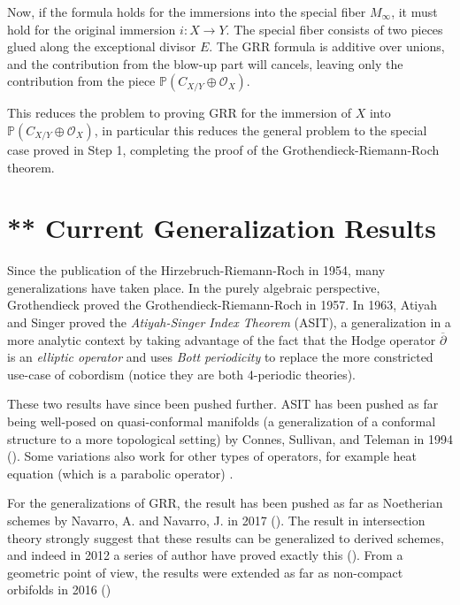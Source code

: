 \documentclass{ut-thesis}
\newenvironment{Proof}[1][]
  {\begin{ProofTcb}[#1]}
  {\end{ProofTcb}}
\renewcommand{\P}{{\mathbb{P}}}
\newcommand{\CO}{{\mathcal{O}}}
\begin{document}
\begin{Proof}
  Now, if the formula holds for the immersions into the special fiber $M_\infty$, it must hold for the original
  immersion $i: X \to Y$. The special fiber consists of two pieces glued along the exceptional divisor $E$. The
  GRR formula is additive over unions, and the contribution from the blow-up part will cancels, leaving only the
  contribution from the piece $\P(C_{X/Y} \oplus \CO_X)$.

  This reduces the problem to proving GRR for the immersion of $X$ into $\P(C_{X/Y} \oplus \CO_X)$, in
  particular this reduces the general problem to the special case proved in Step 1, completing the
  proof of the Grothendieck-Riemann-Roch theorem.
\end{Proof}


\section{** Current Generalization Results}\label{sec:DRR}

Since the publication of the Hirzebruch-Riemann-Roch in 1954, many generalizations have taken place. In the
purely algebraic perspective, Grothendieck proved the Grothendieck-Riemann-Roch in 1957. In 1963, Atiyah and
Singer proved the \emph{Atiyah-Singer Index Theorem} (ASIT), a generalization in a more analytic context by taking
advantage of the fact that the Hodge operator $\overline{\partial}$ is an \emph{elliptic operator} and uses
\emph{Bott periodicity} to replace the more constricted use-case of cobordism (notice they are both
4-periodic theories).

These two results have since been pushed further. ASIT has been pushed as far being well-posed on
quasi-conformal manifolds (a generalization of a conformal structure to a more topological setting) by
Connes, Sullivan, and Teleman in 1994 (\cite{connesQuasiconformalMappingsOperators1994}). Some variations
also work for other types of operators, for example heat equation (which is a parabolic operator)
\cite{gilkeyInvarianceTheoryHeat2018}.

For the generalizations of GRR, the result has been pushed as far as Noetherian schemes by Navarro, A. and
Navarro, J. in 2017 (\cite{navarroRiemannRochFormulaProjective2017}). The result in intersection theory
strongly suggest that these results can be generalized to derived schemes, and indeed in 2012 a series of
author have proved exactly this (\cite{lowreyGrothendieckRiemannRochDerivedSchemes2012}). From a geometric
point of view, the results were extended as far as non-compact orbifolds in 2016
(\cite{montpletRiemannRochIsometriesNoncompact2016})
\end{document}
